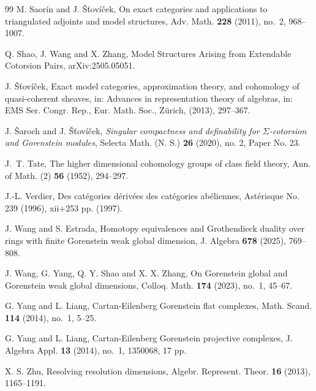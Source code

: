 \documentclass[reqno,12pt]{amsart}
\numberwithin{equation}{section}
\theoremstyle{plain}
\theoremstyle{definition}
\begin{document}
\begin{thebibliography}{99}
 M. Saor\'in and J. \v S\v tov\'i\v cek, On exact categories and applications to triangulated adjoints and model structures, Adv. Math. {\bf 228} (2011), no.~2, 968--1007.

 Q. Shao, J. Wang and X. Zhang, Model Structures Arising from Extendable Cotorsion Pairs, arXiv:2505.05051.

 J. \v S\v tov\'i\v cek, Exact model categories, approximation theory, and cohomology of quasi-coherent sheaves, in: Advances in representation theory of algebras, in: EMS Ser. Congr. Rep., Eur. Math. Soc., Z\"urich, (2013), 297--367.

 J. \v{S}aroch and J. \v{S}\v{t}ov\'{i}\v{c}ek, {\it Singular compactness and definability for $\Sigma$-cotorsion and Gorenstein modules}, Selecta Math. (N. S.) {\bf 26} (2020), no. 2, Paper No. 23.

 J.~T. Tate, The higher dimensional cohomology groups of class field theory, Ann. of Math. (2) {\bf 56} (1952), 294--297.

 J.-L. Verdier, Des cat\'egories d\'eriv\'ees des cat\'egories ab\'eliennes, Ast\'erisque No. 239 (1996), {\rm xii}+253 pp. (1997).

 J. Wang and S. Estrada, Homotopy equivalences and Grothendieck duality over rings with finite Gorenstein weak global dimension, J. Algebra {\bf 678} (2025), 769--808.

 J. Wang, G. Yang, Q. Y. Shao and X. X. Zhang, On Gorenstein global and Gorenstein weak global dimensions, Colloq. Math. {\bf 174} (2023), no.~1, 45--67.

 G. Yang and L. Liang, Cartan-Eilenberg Gorenstein flat complexes, Math. Scand. {\bf 114} (2014), no.~1, 5--25.

 G. Yang and L. Liang, Cartan-Eilenberg Gorenstein projective complexes, J. Algebra Appl. {\bf 13} (2014), no.~1, 1350068, 17 pp.

 X. S. Zhu, Resolving resolution dimensions, Algebr. Represent. Theor. {\bf 16} (2013), 1165--1191.

\end{thebibliography}
\end{document}
